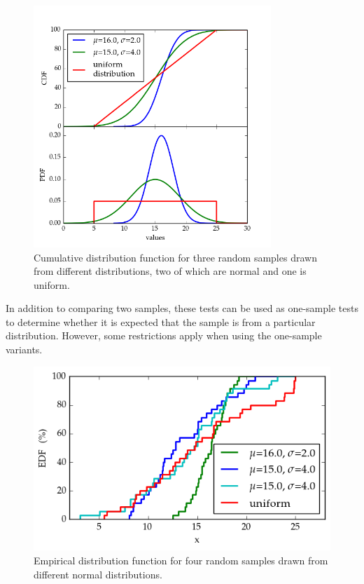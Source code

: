 \documentclass[english, oneside]{HYgradu}
\begin{document}
\begin{figure}
   \centering
   \includegraphics[width=0.8\textwidth]{kuvat/cdf.png}
   \caption{Cumulative distribution function for three random samples drawn from different distributions, two of which are normal and one is uniform.}
   \label{fig:cdf}
\end{figure}

In addition to comparing two samples, these tests can be used as one-sample tests to determine whether it is expected that the sample is from a particular distribution. However, some restrictions apply when using the one-sample variants.
\citep{feigelson2012modern}

\begin{figure}
   \centering
   \includegraphics[width=\textwidth]{kuvat/edf.png}
   \caption{Empirical distribution function for four random samples drawn from different normal distributions.}
   \label{fig:edf}
\end{figure}
\end{document}
